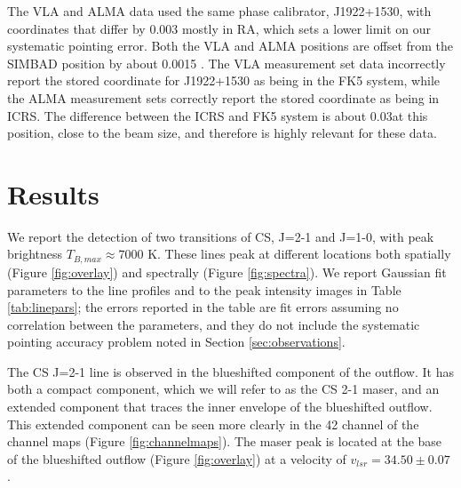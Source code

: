 \documentclass[twocolumn]{aastex62}
\begin{document}
The VLA and ALMA data used the same phase calibrator, J1922+1530, with coordinates
that differ by 0.003 \arcsec mostly in RA, which sets a lower limit on our systematic
pointing error.  Both the VLA and ALMA positions are offset from the SIMBAD
position by about 0.0015 \arcsec.  The VLA measurement set data incorrectly
report the stored coordinate for J1922+1530 as being in the FK5 system, while
the ALMA measurement sets correctly report the stored coordinate as being in ICRS.
The difference between the ICRS and FK5 system is about 0.03\arcsec at this
position, close to the beam size, and therefore is highly relevant for these
data.


\section{Results}
We report the detection of two transitions of CS, J=2-1 and J=1-0, with
peak brightness $T_{B,max}\approx7000$ K.
These lines peak at different locations both spatially (Figure
\ref{fig:overlay}) and spectrally (Figure \ref{fig:spectra}).
We report Gaussian fit parameters to the line profiles and to the peak intensity
images in Table \ref{tab:linepars}; the errors reported in the table are fit
errors assuming no correlation between the parameters, and they do not include
the systematic pointing accuracy problem noted in Section \ref{sec:observations}.

The CS J=2-1 line is observed in the blueshifted component of the outflow.
It has both a compact component, which we will refer to as the CS 2-1 maser,
and an extended component that traces the inner envelope of the blueshifted
outflow.  This extended component can be seen more clearly in the 42 \kms
channel of the channel maps (Figure \ref{fig:channelmaps}).  The maser
peak is located at the base of the blueshifted outflow (Figure
\ref{fig:overlay}) at a velocity of $v_{lsr}=34.50\pm0.07$ \kms.
\end{document}
